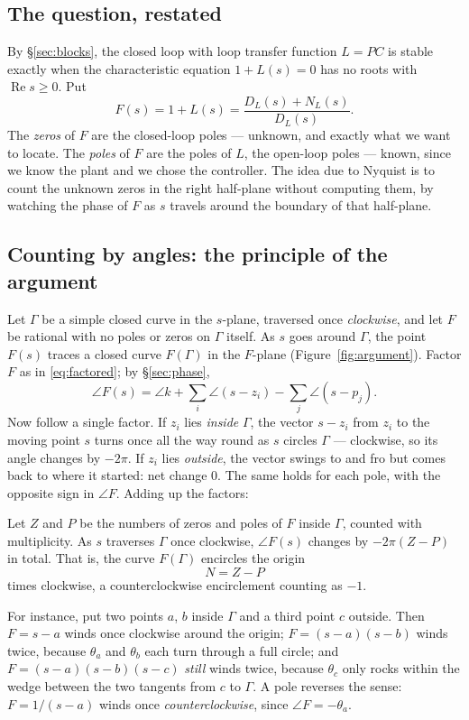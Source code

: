 \documentclass[11pt]{article}
\begin{document}
\subsection{The question, restated}
By \S\ref{sec:blocks}, the closed loop with loop transfer function $L=PC$ is stable
exactly when the characteristic equation $1+L(s)=0$ has no roots with
$\operatorname{Re}s\ge0$. Put
\[
   F(s) = 1+L(s) = \frac{D_L(s)+N_L(s)}{D_L(s)} .
\]
The \emph{zeros} of $F$ are the closed-loop poles --- unknown, and exactly what we
want to locate. The \emph{poles} of $F$ are the poles of $L$, the open-loop poles
--- known, since we know the plant and we chose the controller. The idea due to
Nyquist is to count the unknown zeros in the right half-plane without computing
them, by watching the phase of $F$ as $s$ travels around the boundary of that
half-plane.

\subsection{Counting by angles: the principle of the argument}\label{sec:argument}
Let $\Gamma$ be a simple closed curve in the $s$-plane, traversed once
\emph{clockwise}, and let $F$ be rational with no poles or zeros on $\Gamma$ itself.
As $s$ goes around $\Gamma$, the point $F(s)$ traces a closed curve $F(\Gamma)$ in
the $F$-plane (Figure~\ref{fig:argument}). Factor $F$ as in \eqref{eq:factored};
by \S\ref{sec:phase},
\[
   \angle F(s) = \angle k + \sum_i \angle(s-z_i) - \sum_j \angle(s-p_j) .
\]
Now follow a single factor. If $z_i$ lies \emph{inside} $\Gamma$, the vector
$s-z_i$ from $z_i$ to the moving point $s$ turns once all the way round as $s$
circles $\Gamma$ --- clockwise, so its angle changes by $-2\pi$. If $z_i$ lies
\emph{outside}, the vector swings to and fro but comes back to where it started:
net change $0$. The same holds for each pole, with the opposite sign in
$\angle F$. Adding up the factors:

\begin{theorem}\label{thm:argument}
Let $Z$ and $P$ be the numbers of zeros and poles of $F$ inside $\Gamma$, counted
with multiplicity. As $s$ traverses $\Gamma$ once clockwise, $\angle F(s)$ changes
by $-2\pi(Z-P)$ in total. That is, the curve $F(\Gamma)$ encircles the origin
\[
   N = Z - P
\]
times clockwise, a counterclockwise encirclement counting as $-1$.
\end{theorem}

For instance, put two points $a$, $b$ inside $\Gamma$ and a third point $c$
outside. Then $F=s-a$ winds once clockwise around the origin; $F=(s-a)(s-b)$
winds twice, because $\theta_a$ and $\theta_b$ each turn through a full circle; and
$F=(s-a)(s-b)(s-c)$ \emph{still} winds twice, because $\theta_c$ only rocks within
the wedge between the two tangents from $c$ to $\Gamma$. A pole reverses the sense:
$F=1/(s-a)$ winds once \emph{counterclockwise}, since $\angle F=-\theta_a$.
\end{document}
